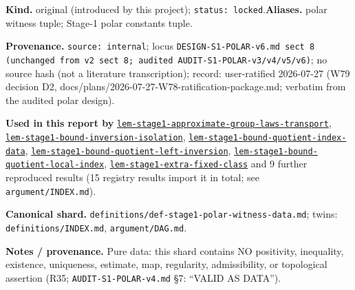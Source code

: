\begin{defnote}
\textbf{Kind.} original (introduced by this project); \texttt{status: locked}.\quad\textbf{Aliases.} polar witness tuple; Stage-1 polar constants tuple.
\par
\textbf{Provenance.} \texttt{source: internal}; locus \texttt{DESIGN-\allowbreak{}S1-\allowbreak{}POLAR-\allowbreak{}v6.\allowbreak{}md sect 8 (unchanged from v2 sect 8;\allowbreak{} audited AUDIT-\allowbreak{}S1-\allowbreak{}POLAR-\allowbreak{}v3/\allowbreak{}v4/\allowbreak{}v5/\allowbreak{}v6)}; no source hash (not a literature transcription); record: user-\allowbreak{}ratified 2026-\allowbreak{}07-\allowbreak{}27 (W79 decision D2,\allowbreak{} docs/\allowbreak{}plans/\allowbreak{}2026-\allowbreak{}07-\allowbreak{}27-\allowbreak{}W78-\allowbreak{}ratification-\allowbreak{}package.\allowbreak{}md;\allowbreak{} verbatim from the audited polar design).
\par
\textbf{Used in this report by} \hyperref[lem:stage1-approximate-group-laws-transport]{\texttt{lem-\allowbreak{}stage1-\allowbreak{}approximate-\allowbreak{}group-\allowbreak{}laws-\allowbreak{}transport}}, \hyperref[lem:stage1-bound-inversion-isolation]{\texttt{lem-\allowbreak{}stage1-\allowbreak{}bound-\allowbreak{}inversion-\allowbreak{}isolation}}, \hyperref[lem:stage1-bound-quotient-index-data]{\texttt{lem-\allowbreak{}stage1-\allowbreak{}bound-\allowbreak{}quotient-\allowbreak{}index-\allowbreak{}data}}, \hyperref[lem:stage1-bound-quotient-left-inversion]{\texttt{lem-\allowbreak{}stage1-\allowbreak{}bound-\allowbreak{}quotient-\allowbreak{}left-\allowbreak{}inversion}}, \hyperref[lem:stage1-bound-quotient-local-index]{\texttt{lem-\allowbreak{}stage1-\allowbreak{}bound-\allowbreak{}quotient-\allowbreak{}local-\allowbreak{}index}}, \hyperref[lem:stage1-extra-fixed-class]{\texttt{lem-\allowbreak{}stage1-\allowbreak{}extra-\allowbreak{}fixed-\allowbreak{}class}} and 9 further reproduced results (15 registry results import it in total; see \texttt{argument/INDEX.md}).
\par
\textbf{Canonical shard.} \texttt{definitions/\allowbreak{}def-\allowbreak{}stage1-\allowbreak{}polar-\allowbreak{}witness-\allowbreak{}data.\allowbreak{}md}; twins: \texttt{definitions/INDEX.md}, \texttt{argument/DAG.md}.
\par
\textbf{Notes / provenance.} Pure data: this shard contains NO positivity,
inequality, existence, uniqueness, estimate, map, regularity, admissibility,
or topological assertion (R35; \texttt{AUDIT-\allowbreak{}S1-\allowbreak{}POLAR-\allowbreak{}v4.\allowbreak{}md} \S{}7: ``VALID AS DATA'').

\end{defnote}
